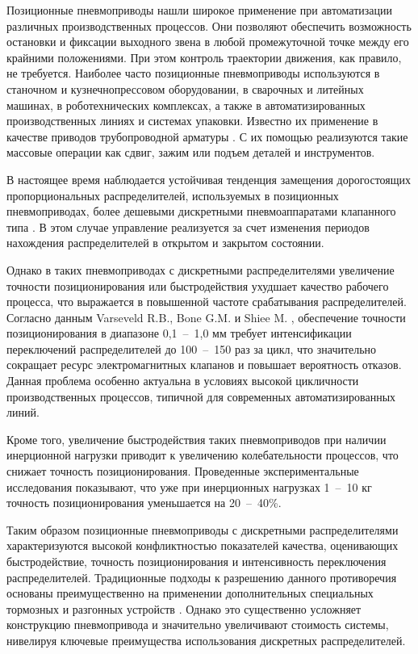 
{\actuality}

Позиционные пневмоприводы нашли широкое применение при автоматизации различных производственных процессов.
Они позволяют обеспечить возможность остановки и фиксации выходного звена в любой промежуточной точке между
его крайними положениями. При этом контроль траектории движения, как правило, не требуется. Наиболее часто
позиционные пневмоприводы используются в станочном и кузнечнопрессовом оборудовании, в сварочных и
литейных машинах, в роботехнических комплексах, а также в автоматизированных производственных линиях
и системах упаковки. Известно их применение в качестве приводов трубопроводной арматуры \cite{Dolgov2017}. С их
помощью реализуются такие массовые операции как сдвиг, зажим или подъем деталей и инструментов.

В настоящее время наблюдается устойчивая тенденция замещения дорогостоящих пропорциональных распределителей,
используемых в позиционных пневмоприводах, более дешевыми дискретными пневмоаппаратами клапанного
типа \cite{Markov2007,Pilgunov2016, An2015}. В этом случае управление реализуется за счет изменения периодов нахождения
распределителей в открытом и закрытом состоянии.

Однако в таких пневмоприводах с дискретными распределителями увеличение точности
позиционирования или быстродействия ухудшает качество рабочего процесса, что выражается
в повышенной частоте срабатывания распределителей. Согласно данным Varseveld R.B., Bone G.M. и
Shiee M. \cite{pwm:Varseveld, Shiee}, обеспечение точности позиционирования в диапазоне 0,1~--~1,0 мм требует интенсификации
переключений распределителей до 100~--~150 раз за цикл, что значительно сокращает ресурс электромагнитных
клапанов и повышает вероятность отказов. Данная проблема особенно актуальна в условиях высокой цикличности
производственных процессов, типичной для современных автоматизированных линий.

Кроме того, увеличение быстродействия таких пневмоприводов при наличии инерционной нагрузки приводит к
увеличению колебательности процессов, что снижает точность позиционирования. Проведенные экспериментальные
исследования \cite{Greshnyakov2016,Hodgson:article1} показывают, что уже при
инерционных нагрузках 1~--~10 кг точность позиционирования уменьшается на 20~--~40\%.

Таким образом позиционные пневмоприводы с дискретными распределителями
характеризуются высокой конфликтностью показателей качества, оценивающих
быстродействие, точность позиционирования и интенсивность переключения распределителей.
Традиционные подходы к разрешению данного противоречия основаны преимущественно на применении
дополнительных специальных тормозных и разгонных устройств \cite{крутиков:способы_торможения_12,DaoTheAnh2016,Grishchenko2010}. Однако это существенно
усложняет конструкцию пневмопривода и значительно увеличивают стоимость системы, нивелируя ключевые
преимущества использования дискретных распределителей.

